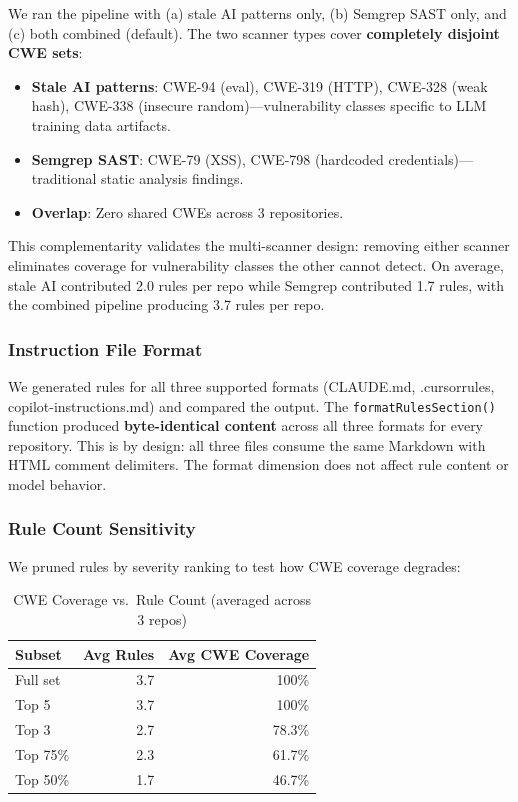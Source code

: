 \documentclass[conference,10pt]{IEEEtran}
\begin{document}
We ran the pipeline with (a) stale AI patterns only, (b) Semgrep SAST only, and (c) both combined (default). The two scanner types cover \textbf{completely disjoint CWE sets}:

\begin{itemize}
    \item \textbf{Stale AI patterns}: CWE-94 (eval), CWE-319 (HTTP), CWE-328 (weak hash), CWE-338 (insecure random)---vulnerability classes specific to LLM training data artifacts.
    \item \textbf{Semgrep SAST}: CWE-79 (XSS), CWE-798 (hardcoded credentials)---traditional static analysis findings.
    \item \textbf{Overlap}: Zero shared CWEs across 3 repositories.
\end{itemize}

This complementarity validates the multi-scanner design: removing either scanner eliminates coverage for vulnerability classes the other cannot detect. On average, stale AI contributed 2.0 rules per repo while Semgrep contributed 1.7 rules, with the combined pipeline producing 3.7 rules per repo.

\subsubsection{Instruction File Format}

We generated rules for all three supported formats (CLAUDE.md, .cursorrules, copilot-instructions.md) and compared the output. The \texttt{formatRulesSection()} function produced \textbf{byte-identical content} across all three formats for every repository. This is by design: all three files consume the same Markdown with HTML comment delimiters. The format dimension does not affect rule content or model behavior.

\subsubsection{Rule Count Sensitivity}

We pruned rules by severity ranking to test how CWE coverage degrades:

\begin{table}[h]
\centering
\caption{CWE Coverage vs.\ Rule Count (averaged across 3 repos)}
\label{tab:ablation-rules}
\begin{tabular}{lrr}
\toprule
\textbf{Subset} & \textbf{Avg Rules} & \textbf{Avg CWE Coverage} \\
\midrule
Full set & 3.7 & 100\% \\
Top 5 & 3.7 & 100\% \\
Top 3 & 2.7 & 78.3\% \\
Top 75\% & 2.3 & 61.7\% \\
Top 50\% & 1.7 & 46.7\% \\
\bottomrule
\end{tabular}
\end{table}
\end{document}
